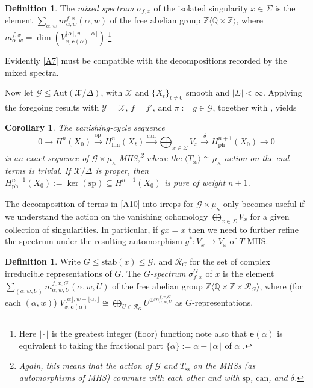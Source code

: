 \documentclass[12pt,letterpaper,english]{amsart}
\numberwithin{equation}{section}
\numberwithin{figure}{section}
\theoremstyle{plain}
\theoremstyle{remark}
\theoremstyle{definition}
\newtheorem{defn}[equation]{Definition}
\theoremstyle{definition}
\theoremstyle{plain}
\newtheorem{cor}[equation]{Corollary}
\theoremstyle{plain}
\theoremstyle{plain}
\theoremstyle{plain}
\theoremstyle{definition}
\def\QQ{\mathbb{Q}}
\def\ZZ{\mathbb{Z}}
\def\Y{\mathcal{Y}}
\def\X{\mathcal{X}}
\def\Y{\mathcal{Y}}
\def\sp{\mathrm{sp}}
\def\can{\mathrm{can}}
\def\be{\mathbf{e}}
\theoremstyle{definition}
\begin{document}
\begin{defn}\label{A8}
The \emph{mixed spectrum} $\sigma_{f,x}$ of the isolated singularity $x\in \Sigma$ is the element $\sum_{\alpha,w}m_{\alpha,w}^{f,x}(\alpha,w)$ of the free abelian group $\ZZ\langle \QQ\times \ZZ\rangle$, where $m_{\alpha,w}^{f,x}=\dim(V_{x,\be(\alpha)}^{\lfloor\alpha\rfloor,w-\lfloor\alpha\rfloor})$.\footnote{Here $\lfloor\cdot\rfloor$ is the greatest integer (floor) function; note also that $\be(\alpha)$ is equivalent to taking the fractional part $\{\alpha\}:=\alpha-\lfloor\alpha\rfloor$ of $\alpha$	.}
\end{defn}
\noindent Evidently \eqref{A7} must be compatible with the decompositions recorded by the mixed spectra.

Now let $\mathcal{G}\leq \mathrm{Aut}(\X/\Delta)$, with $\X$ and $\{X_t\}_{t\neq 0}$ smooth and $|\Sigma|<\infty$.  Applying the foregoing results with $\Y=\X$, $f=f'$, and $\pi:=g\in \mathcal{G}$, together with \cite[Prop.~5.5(i)]{KL1}, yields

\begin{cor}\label{A9}
The vanishing-cycle sequence
\begin{equation}\label{A10}
0\to H^n(X_0)	\overset{\sp}{\to}H^n_{\lim}(X_t)\overset{\can}{\to}\textstyle\bigoplus_{x\in \Sigma}V_x \overset{\delta}{\to}H^{n+1}_{\mathrm{ph}}(X_0)\to 0
\end{equation}
is an exact sequence of $\mathcal{G}\times\mu_{\kappa}$-MHS,\footnote{Again, this means that the action of $\mathcal{G}$ and $T_{\text{ss}}$ on the MHSs (as automorphisms of MHS) commute with each other and with $\sp$, $\can$, and $\delta$.} where the $\langle T_{\text{ss}}\rangle\cong \mu_{\kappa}$-action on the end terms is trivial.  If $\X/\Delta$ is proper, then $H^{n+1}_{\mathrm{ph}}(X_0):=\ker(\sp)\subseteq H^{n+1}(X_0)$ is pure of weight $n+1$.
\end{cor}

The decomposition of terms in \eqref{A10} into irreps for $\mathcal{G}\times\mu_{\kappa}$ only becomes useful if we understand the action on the vanishing cohomology $\bigoplus_{x\in\Sigma}V_x$ for a given collection of singularities.  In particular, if $gx=x$ then we need to further refine the spectrum under the resulting automorphism $g^*\colon V_x\to V_x$ of $T$-MHS.

\begin{defn}\label{A11}
Write $G\leq \mathrm{stab}(x)\leq \mathcal{G}$, and $\mathcal{R}_G$ for the set of complex irreducible representations of $G$.  The \emph{$G$-spectrum} $\sigma_{f,x}^G$ of $x$ is the element $\sum_{(\alpha,w,U)}m^{f,x,G}_{\alpha,w,U}(\alpha,w,U)$ of the free abelian group $\ZZ\langle\QQ\times \ZZ\times \mathcal{R}_G\rangle$, where (for each $(\alpha,w)$) $V_{x,\be(\alpha)}^{\lfloor\alpha\rfloor,w-\lfloor\alpha,\rfloor}\cong \bigoplus_{U\in \mathcal{R}_G}U^{\oplus m^{f,x,G}_{\alpha,w,U}}$ as $G$-representations.
\end{defn}
\end{document}
